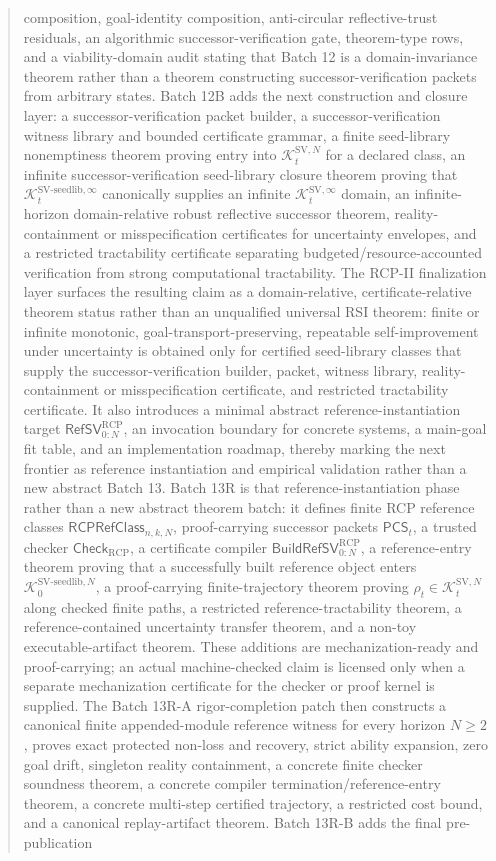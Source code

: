 \documentclass[11pt]{article}
\newcommand{\1}{\mathbf{1}}
\newcommand{\RCP}{\mathrm{RCP}}
\providecommand{\Kcal}{\mathcal{K}}
\begin{document}
\begin{abstract}
composition, goal-identity composition, anti-circular reflective-trust residuals, an algorithmic successor-verification gate, theorem-type rows, and a viability-domain audit stating that Batch 12 is a domain-invariance theorem rather than a theorem constructing successor-verification packets from arbitrary states. Batch 12B adds the next construction and closure layer: a successor-verification packet builder, a successor-verification witness library and bounded certificate grammar, a finite seed-library nonemptiness theorem proving entry into \(\Kcal_t^{\mathrm{SV},N}\) for a declared class, an infinite successor-verification seed-library closure theorem proving that \(\Kcal_t^{\mathrm{SV\mbox{-}seedlib},\infty}\) canonically supplies an infinite \(\Kcal_t^{\mathrm{SV},\infty}\) domain, an infinite-horizon domain-relative robust reflective successor theorem, reality-containment or misspecification certificates for uncertainty envelopes, and a restricted tractability certificate separating budgeted/resource-accounted verification from strong computational tractability. The RCP-II finalization layer surfaces the resulting claim as a domain-relative, certificate-relative theorem status rather than an unqualified universal RSI theorem: finite or infinite monotonic, goal-transport-preserving, repeatable self-improvement under uncertainty is obtained only for certified seed-library classes that supply the successor-verification builder, packet, witness library, reality-containment or misspecification certificate, and restricted tractability certificate. It also introduces a minimal abstract reference-instantiation target \(\mathsf{RefSV}_{0:N}^{\RCP}\), an invocation boundary for concrete systems, a main-goal fit table, and an implementation roadmap, thereby marking the next frontier as reference instantiation and empirical validation rather than a new abstract Batch 13. Batch 13R is that reference-instantiation phase rather than a new abstract theorem batch: it defines finite RCP reference classes \(\mathsf{RCPRefClass}_{n,k,N}\), proof-carrying successor packets \(\mathsf{PCS}_t\), a trusted checker \(\mathsf{Check}_{\RCP}\), a certificate compiler \(\mathsf{BuildRefSV}_{0:N}^{\RCP}\), a reference-entry theorem proving that a successfully built reference object enters \(\Kcal_0^{\mathrm{SV\mbox{-}seedlib},N}\), a proof-carrying finite-trajectory theorem proving \(\rho_t\in\Kcal_t^{\mathrm{SV},N}\) along checked finite paths, a restricted reference-tractability theorem, a reference-contained uncertainty transfer theorem, and a non-toy executable-artifact theorem. These additions are mechanization-ready and proof-carrying; an actual machine-checked claim is licensed only when a separate mechanization certificate for the checker or proof kernel is supplied.  The Batch 13R-A rigor-completion patch then constructs a canonical finite appended-module reference witness for every horizon \(N\ge2\), proves exact protected non-loss and recovery, strict ability expansion, zero goal drift, singleton reality containment, a concrete finite checker soundness theorem, a concrete compiler termination/reference-entry theorem, a concrete multi-step certified trajectory, a restricted cost bound, and a canonical replay-artifact theorem. Batch 13R-B adds the final pre-publication 
\end{abstract}
\end{document}
